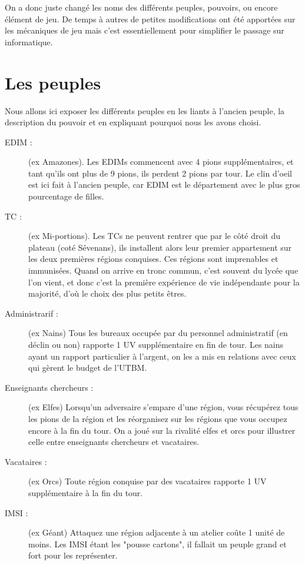 \documentclass[11pt]{report}
\begin{document}
	On a donc juste changé les noms des différents peuples, pouvoirs, ou encore élément de jeu. De temps à autres de petites modifications ont été apportées sur les mécaniques de jeu mais c'est essentiellement pour simplifier le passage sur informatique.    

	\section{Les peuples}
	
	Nous allons ici exposer les différents peuples en les liants à l'ancien peuple, la description du pouvoir et en expliquant pourquoi nous les avons choisi.
	
	\begin{description}
		\item[EDIM :] (ex Amazones). Les EDIMs commencent avec 4 pions supplémentaires, et tant qu'ils ont plus de 9 pions, ils perdent 2 pions par tour. Le clin d'oeil est ici fait à l'ancien peuple, car EDIM est le département avec le plus gros pourcentage de filles.
		\item[TC :] (ex Mi-portions). Les TCs ne peuvent rentrer que par le côté droit du plateau (coté Sévenans), ils installent alors leur premier appartement sur les deux premières régions conquises. Ces régions sont imprenables et immunisées. Quand on arrive en tronc commun, c'est souvent du lycée que l'on vient, et donc c'est la première expérience de vie indépendante pour la majorité, d'où le choix des plus petits êtres.
		\item[Administrarif :] (ex Nains) Tous les bureaux occupée par du personnel administratif (en déclin ou non) rapporte 1 UV supplémentaire en fin de tour. Les nains ayant un rapport particulier à l'argent, on les a mis en relations avec ceux qui gèrent le budget de l'UTBM.
		\item[Enseignants chercheurs :] (ex Elfes) Lorsqu'un adversaire s'empare d'une région, vous récupérez tous les pions de la région et les réorganisez sur les régions que vous occupez encore à la fin du tour. On a joué sur la rivalité elfes et orcs pour illustrer celle entre enseignants chercheurs et vacataires.
		\item[Vacataires :] (ex Orcs) Toute région conquise par des vacataires rapporte 1 UV supplémentaire à la fin du tour.
		\item[IMSI :] (ex Géant) Attaquez une région adjacente à un atelier coûte 1 unité de moins. Les IMSI étant les "pousse cartons", il fallait un peuple grand et fort pour les représenter.

\end{description}
\end{document}
